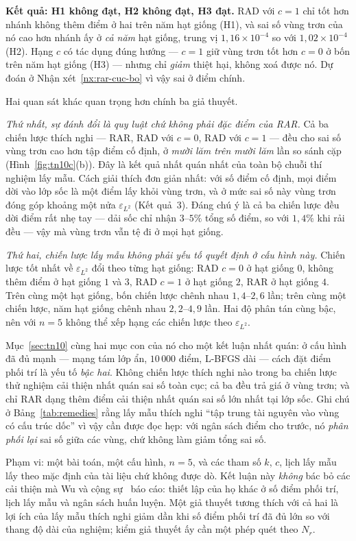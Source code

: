 \textbf{Kết quả: H1 không đạt, H2 không đạt, H3 đạt.}
RAD với $c = 1$ chỉ tốt hơn nhánh không thêm điểm ở hai trên năm hạt giống
(H1), và sai số vùng trơn của nó cao hơn nhánh ấy ở \emph{cả năm} hạt giống,
trung vị $1{,}16\times10^{-4}$ so với $1{,}02\times10^{-4}$ (H2). Hạng $c$ có
tác dụng đúng hướng --- $c = 1$ giữ vùng trơn tốt hơn $c = 0$ ở bốn trên năm hạt
giống (H3) --- nhưng chỉ \emph{giảm} thiệt hại, không xoá được nó. Dự đoán ở
Nhận xét~\ref{nx:rar-cuc-bo} vì vậy sai ở điểm chính.

Hai quan sát khác quan trọng hơn chính ba giả thuyết.

\emph{Thứ nhất, sự đánh đổi là quy luật chứ không phải đặc điểm của RAR.} Cả ba
chiến lược thích nghi --- RAR, RAD với $c = 0$, RAD với $c = 1$ --- đều cho sai
số vùng trơn cao hơn tập điểm cố định, ở \emph{mười lăm trên mười lăm} lần so
sánh cặp (Hình~\ref{fig:tn10c}(b)). Đây là kết quả nhất quán nhất của toàn bộ
chuỗi thí nghiệm lấy mẫu. Cách giải thích đơn giản nhất: với số điểm cố định,
mọi điểm dời vào lớp sốc là một điểm lấy khỏi vùng trơn, và ở mức sai số này
vùng trơn đóng góp khoảng một nửa $\varepsilon_{L^2}$ (Kết quả~3). Đáng chú ý là
cả ba chiến lược đều dời điểm rất nhẹ tay --- dải sốc chỉ nhận $3$--$5\%$ tổng số
điểm, so với $1{,}4\%$ khi rải đều --- vậy mà vùng trơn vẫn tệ đi ở mọi hạt giống.

\emph{Thứ hai, chiến lược lấy mẫu không phải yếu tố quyết định ở cấu hình này.}
Chiến lược tốt nhất về $\varepsilon_{L^2}$ đổi theo từng hạt giống: RAD $c = 0$
ở hạt giống $0$, không thêm điểm ở hạt giống $1$ và $3$, RAD $c = 1$ ở hạt giống
$2$, RAR ở hạt giống $4$. Trên cùng một hạt giống, bốn chiến lược chênh nhau
$1{,}4$--$2{,}6$ lần; trên cùng một chiến lược, năm hạt giống chênh nhau
$2{,}2$--$4{,}9$ lần. Hai độ phân tán cùng bậc, nên với $n = 5$ không thể xếp hạng
các chiến lược theo $\varepsilon_{L^2}$.

\begin{nhanxet}
\label{nx:lay-mau}
Mục~\ref{sec:tn10} cùng hai mục con của nó cho một kết luận nhất quán: ở cấu hình đã đủ
mạnh --- mạng tám lớp ẩn, $10\,000$ điểm, L-BFGS dài --- cách đặt điểm phối trí là
yếu tố \emph{bậc hai}. Không chiến lược thích nghi nào trong ba chiến lược thử
nghiệm cải thiện nhất quán sai số toàn cục; cả ba đều trả giá ở vùng trơn; và
chỉ RAR dạng thêm điểm cải thiện nhất quán sai số lớn nhất tại lớp sốc. Ghi chú
ở Bảng~\ref{tab:remedies} rằng lấy mẫu thích nghi ``tập trung tài nguyên vào vùng
có cấu trúc dốc'' vì vậy cần được đọc hẹp: với ngân sách điểm cho trước, nó \emph{phân
phối lại} sai số giữa các vùng, chứ không làm giảm tổng sai số.

Phạm vi: một bài toán, một cấu hình, $n = 5$, và các tham số $k$, $c$, lịch lấy
mẫu lấy theo mặc định của tài liệu chứ không được dò. Kết luận này \emph{không}
bác bỏ các cải thiện mà Wu và cộng sự~\cite{wu2023} báo cáo: thiết lập của họ
khác ở số điểm phối trí, lịch lấy mẫu và ngân sách huấn luyện. Một giả thuyết
tương thích với cả hai là lợi ích của lấy mẫu thích nghi giảm dần khi số điểm
phối trí đã đủ lớn so với thang độ dài của nghiệm; kiểm giả thuyết ấy cần một
phép quét theo $N_r$.
\end{nhanxet}

